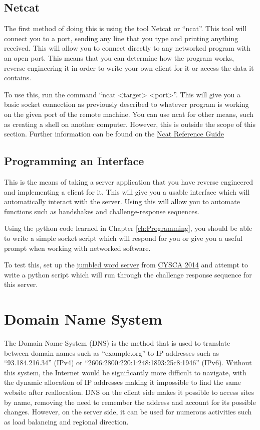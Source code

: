 \documentclass[a4paper,11pt]{report}
\begin{document}
		\subsection{Netcat}
			The first method of doing this is using the tool Netcat or ``ncat''. 
			This tool will connect you to a port, sending any line that you type and printing anything received. 
			This will allow you to connect directly to any networked program with an open port.
			This means that you can determine how the program works, reverse engineering it in order to write your own client for it or access the data it contains. 

			To use this, run the command ``ncat <target> <port>''. 
			This will give you a basic socket connection as previously described to whatever program is working on the given port of the remote machine. 
			You can use ncat for other means, such as creating a shell on another computer. 
			However, this is outside the scope of this section. 
			Further information can be found on the \href{https://nmap.org/book/ncat-man.html}{Ncat Reference Guide}

		\subsection{Programming an Interface}
			This is the means of taking a server application that you have reverse engineered and implementing a client for it. 
			This will give you a usable interface which will automatically interact with the server. 
			Using this will allow you to automate functions such as handshakes and challenge-response sequences. 

			Using the python code learned in Chapter \ref{ch:Programming}, 
			you should be able to write a simple socket script which will respond for you or give you a useful prompt when working with networked software. 

			To test this, set up the \href{https://github.com/CySCA/CySCA2014/blob/master/misc-server/programming/prog01/server.py}{jumbled word server} from \href{https://cyberchallenge.com.au/}{CYSCA 2014} and attempt to write a python script which will run through the challenge response sequence for this server. 

	\section{Domain Name System}
		The Domain Name System (DNS) is the method that is used to translate between domain names such as ``example.org'' to IP addresses such as ``93.184.216.34'' (IPv4) or ``2606:2800:220:1:248:1893:25c8:1946'' (IPv6).
		Without this system, the Internet would be significantly more difficult to navigate, with the dynamic allocation of IP addresses making it impossible to find the same website after reallocation. 
		DNS on the client side makes it possible to access sites by name, removing the need to remember the address and account for its possible changes. 
		However, on the server side, it can be used for numerous activities such as load balancing and regional direction. 
\end{document}
